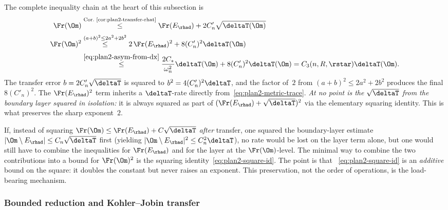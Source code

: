 \begin{remark}
\label{rem:plan2-squaring-explicit}
The complete inequality chain at the heart of this subsection is
\begin{equation}\label{eq:plan2-chain}
\begin{aligned}
\Fr(\Om)
&\stackrel{\text{Cor.\ \ref{cor:plan2-transfer-rhat}}}{\le}
 \Fr(E_{\rhad})+2C'_n\sqrt{\deltaT(\Om)} \\[2pt]
\Fr(\Om)^{2}
&\stackrel{(a+b)^{2}\le 2a^{2}+2b^{2}}{\le}
 2\,\Fr(E_{\rhad})^{2}+8(C'_n)^{2}\deltaT(\Om) \\[2pt]
&\stackrel{\eqref{eq:plan2-asym-from-dx}}{\le}
 \frac{2C_*}{\omega_n^{2}}\deltaT(\Om)
 +8(C'_n)^{2}\deltaT(\Om)
 =C_3(n,R,\rstar)\deltaT(\Om).
\end{aligned}
\end{equation}
The transfer error $b=2C'_n\sqrt{\deltaT}$ is squared to
$b^{2}=4(C'_n)^{2}\deltaT$, and the factor of~$2$ from
$(a+b)^{2}\le 2a^{2}+2b^{2}$ produces the final $8(C'_n)^{2}$. The
$\Fr(E_{\rhad})^{2}$ term inherits a $\deltaT$-rate directly
from~\eqref{eq:plan2-metric-trace}. \emph{At no point is the
$\sqrt{\deltaT}$ from the boundary layer squared in isolation:} it is
always squared as part of $(\Fr(E_{\rhad})+\sqrt{\deltaT})^{2}$ via
the elementary squaring identity. This is what preserves the sharp
exponent~$2$.
\end{remark}

\begin{remark}
\label{rem:plan2-square-before}
If, instead of squaring $\Fr(\Om)\le\Fr(E_{\rhad})+C\sqrt{\deltaT}$
\emph{after} transfer, one squared the boundary-layer estimate
$|\Om\setminus E_{\rhad}|\le C_n\sqrt{\deltaT}$ first (yielding
$|\Om\setminus E_{\rhad}|^{2}\le C_n^{2}\deltaT$), no rate would be
lost on the layer term alone, but one would still have to combine the
inequalities for $\Fr(E_{\rhad})$ and for the layer at the
$\Fr(\Om)$-level. The minimal way to combine the two contributions
into a bound for $\Fr(\Om)^{2}$ is the squaring
identity~\eqref{eq:plan2-square-id}. The point is that
~\eqref{eq:plan2-square-id} is an \emph{additive} bound on the
square: it doubles the constant but never raises an exponent. This
preservation, not the order of operations, is the load-bearing
mechanism.
\end{remark}

\subsubsection{Bounded reduction and Kohler--Jobin transfer}
\label{sssec:plan2-reduction-kj}

